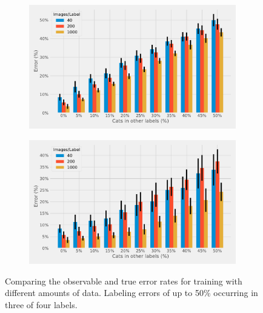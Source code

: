 \documentclass[a4paper,11pt]{scrartcl}
\theoremstyle{definition}
\begin{document}
\begin{figure}%
\centering
\begin{subfigure}[t]{0.49\textwidth}
\includegraphics[width=0.99\textwidth]{Plots_3/Observable_Test_Error_comparison.pdf}
\label{subfig:four_classes_observable_error}
\end{subfigure}
\begin{subfigure}[t]{0.49\textwidth}
\includegraphics[width=0.99\textwidth]{Plots_3/True_Test_Error_comparison.pdf}
\label{subfig:four_classes_true_error}
\end{subfigure}
\caption[Error development for different training sizes]{Comparing the observable and true error rates for training with different amounts of data. Labeling errors of up to 50\% occurring in three of four labels.}
\label{fig:four_class_error_development}
\end{figure}
\end{document}
